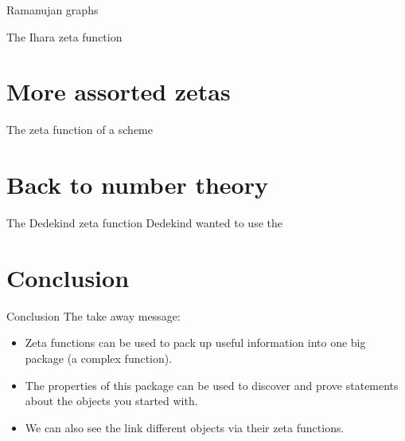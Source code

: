 \documentclass{beamer}
\begin{document}
\begin{frame}{Ramanujan graphs}
\begin{block}{}
\end{block}
\end{frame}
\begin{frame}{The Ihara zeta function}
\begin{block}{}
\end{block}
\end{frame}

\section[More zetas]{More assorted zetas}

\begin{frame}{The zeta function of a scheme}
\begin{block}{}
\end{block}
\end{frame}

\section[Number theory again]{Back to number theory}
\begin{frame}{The Dedekind zeta function}
Dedekind wanted to use the 
\begin{block}{}
\end{block}
\end{frame}

\section{Conclusion}
\begin{frame}{Conclusion}
The take away message:
\begin{itemize}
\item Zeta functions can be used to pack up useful information into one big package (a complex function).
\pause\item The properties of this package can be used to discover and prove statements about the objects you started with.
\pause\item We can also see the link different objects via their zeta functions.
\end{itemize}
\end{frame}
\end{document}
